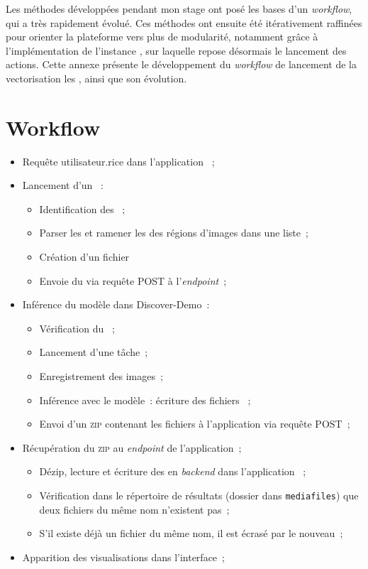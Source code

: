 Les méthodes développées pendant mon stage ont posé les bases d’un \textit{workflow}, qui a très rapidement évolué. Ces méthodes ont ensuite été itérativement raffinées pour orienter la plateforme vers plus de modularité, notamment grâce à l'implémentation de l'instance \tr, sur laquelle repose désormais le lancement des actions. Cette annexe présente le développement du \textit{workflow} de lancement de la vectorisation les \wits, ainsi que son évolution.  

\section{Workflow}
	\begin{itemize}
    \item Requête utilisateur.rice dans l’application \aikon~;
    \item Lancement d'un \tr~:
    \begin{itemize}
        \item Identification des \wits~;
        \item Parser les \mans et ramener les \URLs des régions d'images dans une liste~;
        \item Création d'un fichier \json 
        \item Envoie du \json via requête \http POST à l’\api \textit{endpoint}~;
    \end{itemize}
    \item Inférence du modèle dans Discover-Demo~: 
    \begin{itemize}
        \item Vérification du \json~; 
        \item Lancement d'une tâche~; 
        \item Enregistrement des images~;  
        \item Inférence avec le modèle~: écriture des fichiers \svgs~; 
        \item Envoi d’un \textsc{zip} contenant les fichiers à l'application via requête \http POST~;
    \end{itemize}
    \item Récupération du \textsc{zip} au \textit{endpoint} de l’application~;
    \begin{itemize}
        \item Dézip, lecture et écriture des \svgs en \textit{backend} dans l’application \aikon~;
        \item Vérification dans le répertoire de résultats (dossier dans \texttt{mediafiles}) que deux fichiers du même nom n’existent pas~;
        \item S’il existe déjà un fichier du même nom, il est écrasé par le nouveau~;
    \end{itemize}
    \item Apparition des visualisations dans l'interface~;
\end{itemize}

